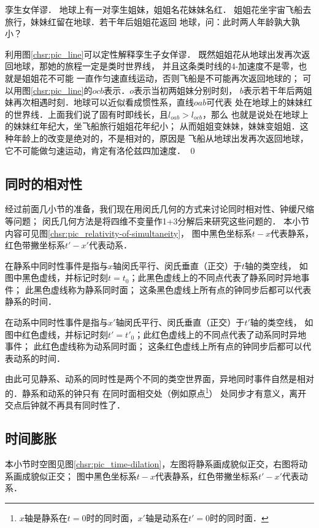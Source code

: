 \begin{example}
    孪生女佯谬．
    地球上有一对孪生姐妹，姐姐名{\fangsong 花}妹妹名{\fangsong 红}．
    姐姐{\fangsong 花}坐宇宙飞船去旅行，妹妹{\fangsong 红}留在地球．若干年后姐姐{\fangsong 花}返回
    地球，问：此时两人年龄孰大孰小？
\end{example}
利用图\ref{chsr:pic_line}可以定性解释孪生子女佯谬．
既然姐姐{\fangsong 花}从地球出发再次返回地球，那她的旅程一定是类时世界线，
并且这条类时线的4-加速度不是零，也就是姐姐{\fangsong 花}不可能
一直作匀速直线运动，否则飞船是不可能再次返回地球的；
可以用图\ref{chsr:pic_line}的$ocb$表示．$o$表示当初两姐妹分别时刻，
$b$表示若干年后两姐妹再次相遇时刻．地球可以近似看成惯性系，直线$oab$可代表
处在地球上的妹妹{\fangsong 红}的世界线．上面我们说了固有时即线长，且$l_{oab}>l_{ocb}$，那么
也就是说处在地球上的妹妹{\fangsong 红}年纪大，坐飞船旅行姐姐{\fangsong 花}年纪小；
从而姐姐变妹妹，妹妹变姐姐．这种年龄上的改变是绝对的，不是相对的，原因是
飞船从地球出发再次返回地球，它不可能做匀速运动，肯定有洛伦兹四加速度．
\qed

\subsection{同时的相对性}
经过前面几小节的准备，我们现在用闵氏几何的方式来讨论同时相对性、钟缓尺缩等问题；
闵氏几何方法是将四维不变量作1+3分解后来研究这些问题的．
本小节内容可见图\ref{chsr:pic_relativity-of-simultaneity}，
图中黑色坐标系$t-x$代表静系，红色带撇坐标系$t'-x'$代表动系．

在静系中同时性事件是指与$x$轴闵氏平行、闵氏垂直（正交）于$t$轴的类空线，
如图中黑色虚线，并标记时刻$t=t_0$；此黑色虚线上的不同点代表了静系同时异地事件；
此黑色虚线称为静系同时面；
这条黑色虚线上所有点的钟同步后都可以代表静系的时间．

在动系中同时性事件是指与$x'$轴闵氏平行、闵氏垂直（正交）于$t'$轴的类空线，
如图中红色虚线，并标记时刻$t'=t'_0$；此红色虚线上的不同点代表了动系同时异地事件；
此红色虚线称为动系同时面；
这条红色虚线上所有点的钟同步后都可以代表动系的时间．

由此可见静系、动系的同时性是两个不同的类空世界面，异地同时事件自然是相对的．静系和动系的钟只有
在同时面相交处（例如原点{\footnote{$x$轴是静系在$t=0$时的同时面，$x'$轴是动系在$t'=0$时的同时面．}}）
处同步才有意义，离开交点后钟就不再具有同时性了．



\subsection{时间膨胀}
本小节时空图见图\ref{chsr:pic_time-dilation}，左图将静系画成貌似正交，右图将动系画成貌似正交；
图中黑色坐标系$t-x$代表静系，红色带撇坐标系$t'-x'$代表动系．

